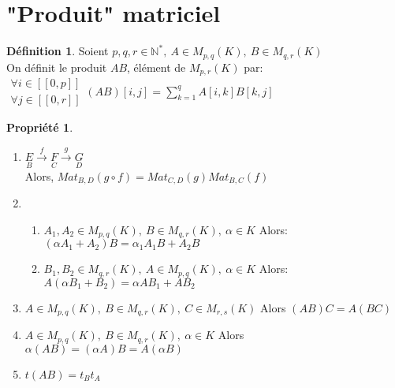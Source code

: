 \documentclass[fleqn]{article}
\theoremstyle{definition} \newtheorem*{defi}{D\'efinition}
\theoremstyle{definition} \newtheorem*{theo}{Th\'eor\`eme}
\theoremstyle{definition} \newtheorem*{coro}{Corollaire}
\theoremstyle{definition} \newtheorem*{nota}{Notation}
\theoremstyle{definition} \newtheorem*{vocab}{Vocabulaire}
\theoremstyle{remark} \newtheorem*{rqs}{Remarques}
\theoremstyle{definition} \newtheorem*{prop}{Propri\'et\'e}
\begin{document}
\section{"Produit" matriciel}
\begin{defi} Soient $p,q,r \in \mathbb{N}^*,\ A \in M_{p,q}(K),\ B \in M_{q,r}(K)$ \\
	On d\'efinit le produit $AB$, \'el\'ement de $M_{p,r}(K)$ par: \\
	$\left. \begin{array}{l}
		\forall i \in [\![0,p]\!] \\
		\forall j \in [\![0,r]\!]
	\end{array}\right. (AB)[i,j] = \sum_{k=1}^q A[i,k]B[k,j]$

\end{defi}

\begin{prop} $ $
	\begin{enumerate}
		\item $\underset{B}{E} \overset{f}{\rightarrow} \underset{C}{F} \overset{g}{\rightarrow} \underset{D}{G}$ \\
			Alors, $Mat_{B,D}(g\circ f) = Mat_{C,D}(g) Mat_{B,C}(f)$
		\item
			\begin{enumerate}
				\item $A_1, A_2 \in M_{p,q}(K),\ B \in M_{q,r}(K),\ \alpha \in K$ Alors:\\ $(\alpha A_1 + A_2)B = \alpha_1 A_1 B + A_2 B$
				\item $B_1, B_2 \in M_{q,r}(K),\ A \in M_{p,q}(K),\ \alpha \in K$ Alors:\\ $A(\alpha B_1 + B_2) = \alpha A B_1 + A B_2$
			\end{enumerate}
		\item $A \in M_{p,q}(K),\ B \in M_{q,r}(K),\ C \in M_{r,s}(K)$ Alors $(AB)C = A(BC)$
		\item $A \in M_{p,q}(K),\ B \in M_{q,r}(K),\ \alpha \in K$ Alors $\alpha (AB) = (\alpha A)B = A (\alpha B)$
		\item $t(AB) = t_B t_A$
	\end{enumerate}
\end{prop}
\end{document}
